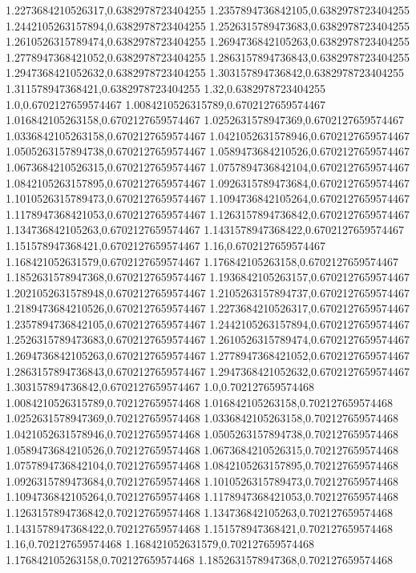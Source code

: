 1.2273684210526317,0.6382978723404255
1.2357894736842105,0.6382978723404255
1.2442105263157894,0.6382978723404255
1.2526315789473683,0.6382978723404255
1.2610526315789474,0.6382978723404255
1.2694736842105263,0.6382978723404255
1.2778947368421052,0.6382978723404255
1.2863157894736843,0.6382978723404255
1.2947368421052632,0.6382978723404255
1.303157894736842,0.6382978723404255
1.311578947368421,0.6382978723404255
1.32,0.6382978723404255
1.0,0.6702127659574467
1.0084210526315789,0.6702127659574467
1.016842105263158,0.6702127659574467
1.0252631578947369,0.6702127659574467
1.0336842105263158,0.6702127659574467
1.0421052631578946,0.6702127659574467
1.0505263157894738,0.6702127659574467
1.0589473684210526,0.6702127659574467
1.0673684210526315,0.6702127659574467
1.0757894736842104,0.6702127659574467
1.0842105263157895,0.6702127659574467
1.0926315789473684,0.6702127659574467
1.1010526315789473,0.6702127659574467
1.1094736842105264,0.6702127659574467
1.1178947368421053,0.6702127659574467
1.1263157894736842,0.6702127659574467
1.134736842105263,0.6702127659574467
1.1431578947368422,0.6702127659574467
1.151578947368421,0.6702127659574467
1.16,0.6702127659574467
1.168421052631579,0.6702127659574467
1.176842105263158,0.6702127659574467
1.1852631578947368,0.6702127659574467
1.1936842105263157,0.6702127659574467
1.2021052631578948,0.6702127659574467
1.2105263157894737,0.6702127659574467
1.2189473684210526,0.6702127659574467
1.2273684210526317,0.6702127659574467
1.2357894736842105,0.6702127659574467
1.2442105263157894,0.6702127659574467
1.2526315789473683,0.6702127659574467
1.2610526315789474,0.6702127659574467
1.2694736842105263,0.6702127659574467
1.2778947368421052,0.6702127659574467
1.2863157894736843,0.6702127659574467
1.2947368421052632,0.6702127659574467
1.303157894736842,0.6702127659574467
1.0,0.702127659574468
1.0084210526315789,0.702127659574468
1.016842105263158,0.702127659574468
1.0252631578947369,0.702127659574468
1.0336842105263158,0.702127659574468
1.0421052631578946,0.702127659574468
1.0505263157894738,0.702127659574468
1.0589473684210526,0.702127659574468
1.0673684210526315,0.702127659574468
1.0757894736842104,0.702127659574468
1.0842105263157895,0.702127659574468
1.0926315789473684,0.702127659574468
1.1010526315789473,0.702127659574468
1.1094736842105264,0.702127659574468
1.1178947368421053,0.702127659574468
1.1263157894736842,0.702127659574468
1.134736842105263,0.702127659574468
1.1431578947368422,0.702127659574468
1.151578947368421,0.702127659574468
1.16,0.702127659574468
1.168421052631579,0.702127659574468
1.176842105263158,0.702127659574468
1.1852631578947368,0.702127659574468

